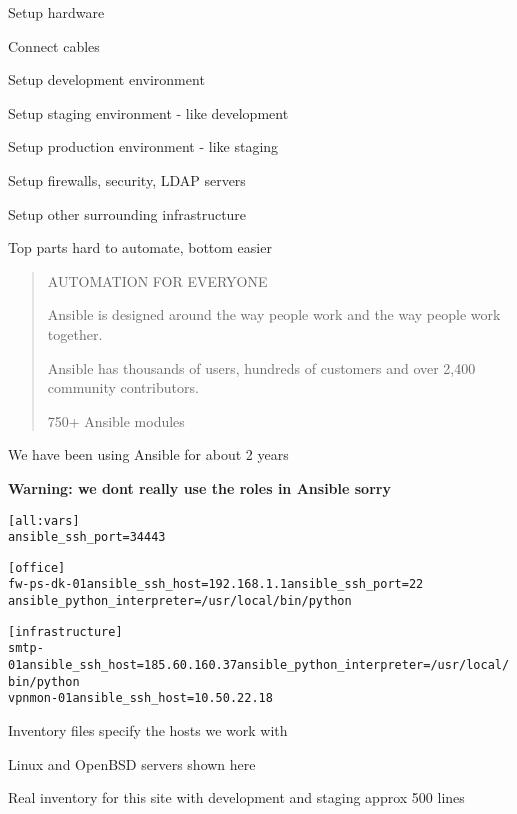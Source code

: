 \documentclass[18pt,landscape,a4paper,footrule]{foils}
\begin{document}

\begin{list2}
\item Setup hardware
\item Connect cables
\vskip 5mm
\item Setup development environment
\item Setup staging environment - like development
\item Setup production environment - like staging
\item Setup firewalls, security, LDAP servers
\item Setup other surrounding infrastructure
\end{list2}

\vskip 5mm
\centerline{Top parts hard to automate, bottom easier \smiley}




\begin{quote}\small
AUTOMATION FOR EVERYONE

Ansible is designed around the way people work and the way people work together.

Ansible has thousands of users, hundreds of customers and over 2,400 community contributors.

750+ Ansible modules
\end{quote}


\vskip 2cm
\centerline{We have been using Ansible for about 2 years}

\vskip 2cm
{\bf Warning: we dont really use the roles in Ansible sorry}


\begin{alltt}\footnotesize
[all:vars]
ansible_ssh_port=34443

[office]
fw-ps-dk-01 ansible_ssh_host=192.168.1.1 ansible_ssh_port=22
ansible_python_interpreter=/usr/local/bin/python

[infrastructure]
smtp-01     ansible_ssh_host=185.60.160.37 ansible_python_interpreter=/usr/local/bin/python
vpnmon-01   ansible_ssh_host=10.50.22.18

\end{alltt}

\begin{list2}
\item Inventory files specify the hosts we work with
\item Linux and OpenBSD servers shown here
\item Real inventory for this site with development and staging approx 500 lines
\end{list2}
\end{document}
